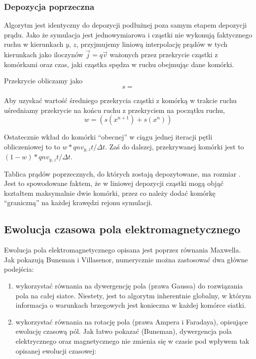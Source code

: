 \subsubsection{Depozycja poprzeczna} %
Algorytm jest identyczny do depozycji podłużnej poza samym etapem depozycji
prądu. Jako że symulacja jest jednowymiarowa i cząstki nie wykonują
faktycznego ruchu w kierunkach $y$, $z$, przyjmujemy liniową interpolację
prądów w tych kierunkach jako iloczynów $\vec{j}=q\vec{v}$ ważonych przez przekrycie
cząstki z komórkami oraz czas, jaki cząstka spędza w ruchu obejmując dane
komórki.

Przekrycie obliczamy jako
\begin{equation}
    s =
\end{equation}

Aby uzyskać wartość średniego przekrycia cząstki z komórką w trakcie ruchu
uśredniamy przekrycie na końcu ruchu z przekryciem na początku ruchu,
\begin{equation}
    w = {(s(x^{n+1}) + s(x^n))}
\end{equation}

Ostatecznie wkład do komórki ``obecnej'' w ciągu jednej iteracji pętli obliczeniowej to 
to $w * q n v_{y, z} t / \Delta t$.
Zaś do dalszej, przekrywanej komórki jest to  $(1-w) * q n v_{y, z} t / \Delta t$.

Tablica prądów poprzecznych, do których zostają depozytowane, ma rozmiar
. Jest to spowodowane faktem, że w liniowej depozycji
cząstki mogą objąć kształtem maksymalnie dwie komórki, przez co należy dodać
komórkę ``graniczną'' na każdej krawędzi rejonu symulacji.


\subsection{Ewolucja czasowa pola elektromagnetycznego} 

Ewolucja pola elektromagnetycznego opisana jest poprzez równania Maxwella.
Jak pokazują Buneman i Villasenor, numerycznie można zastosować dwa główne
podejścia: \cite{bunemanvillasenor}

\begin{enumerate}
    \item wykorzystać równania na dywergencję pola (prawa Gaussa) do
    rozwiązania pola na całej siatce. Niestety, jest to algorytm
    inherentnie globalny, w którym informacja o warunkach brzegowych
    jest konieczna w każdej komórce siatki.

    \item wykorzystać równania na rotację pola (prawa Ampera i Faradaya),
    opisujące ewolucję czasową pól. Jak łatwo pokazać (Buneman), dywergencja
    pola elektrycznego oraz magnetycznego nie zmienia się w czasie pod
    wpływem tak opisanej ewolucji czasowej:
\end{enumerate}

